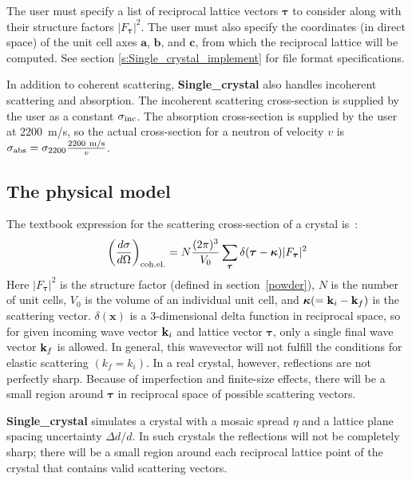 The user must specify a list of reciprocal lattice vectors
$\boldsymbol{\tau}$ to consider along with their structure factors
$|F_{\boldsymbol{\tau}}|^2$. The user must also specify the coordinates
(in direct space) of the unit cell axes $\boldsymbol{a}$,
$\boldsymbol{b}$, and $\boldsymbol{c}$, from which the reciprocal lattice
will be computed. See section \ref{s:Single_crystal_implement} for file format specifications.

In addition to coherent scattering, {\bf Single\_crystal} also
handles incoherent scattering and absorption. The incoherent scattering
cross-section is supplied by the user as a constant
$\sigma_{\rm inc}$. The absorption cross-section is supplied by the user at
2200~m/s, so the actual cross-section for a neutron of velocity $v$ is
$\sigma_{\rm abs} = \sigma_{2200} \frac{\rm 2200~m/s}{v}$.

\subsection{The physical model}

The textbook expression for the scattering cross-section of a crystal
is~\cite[ch.3]{squires}:
\begin{equation}
\label{eq:sigma_coh_el}
\left(\frac{d\sigma}{d\Omega}\right)_{\rm coh.el.} =
        N\frac{(2\pi)^3}{V_0}\sum_{\boldsymbol{\tau}}
        \delta(\boldsymbol{\tau} - \boldsymbol{\kappa})|F_{\boldsymbol{\tau}}|^2
\end{equation}
Here $|F_{\boldsymbol{\tau}}|^2$ is the structure factor
(defined in section~\ref{powder}), $N$ is the
number of unit cells, $V_0$ is the volume of an
individual unit cell, and $\boldsymbol{\kappa} (= {\bf k}_i - {\bf k}_f)$
is the scattering vector. $\delta(\boldsymbol{x})$ is a 3-dimensional delta
function in reciprocal space,
so for given incoming wave vector ${\bf k}_i$ and lattice vector
${\boldsymbol{\tau}}$, only a single final wave vector ${\bf k}_f$ is allowed.
In general, this wavevector will not fulfill the conditions for elastic
scattering $(k_f = k_i)$.
In a real crystal, however, reflections are not perfectly sharp. Because
of imperfection and finite-size effects, there will be a small region
around $\boldsymbol{\tau}$ in reciprocal space of possible scattering vectors.

{\bf Single\_crystal} simulates a crystal with a mosaic spread
$\eta$ and a lattice plane spacing uncertainty $\Delta d/d$. In such
crystals the reflections will not be completely sharp;
there will be a small region around each reciprocal lattice point of the
crystal that contains valid scattering vectors.

